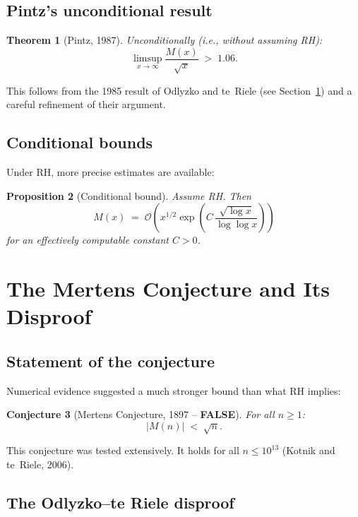 \documentclass[12pt,a4paper]{amsart}
\newtheorem{theorem}{Theorem}[section]
\newtheorem{proposition}[theorem]{Proposition}
\newtheorem{conjecture}[theorem]{Conjecture}
\theoremstyle{definition}
\newcommand{\BigO}{\mathcal{O}}
\begin{document}
\subsection{Pintz's unconditional result}

\begin{theorem}[Pintz, 1987]
\label{thm:pintz}
Unconditionally (i.e., without assuming RH):
\[
  \limsup_{x \to \infty} \frac{M(x)}{\sqrt{x}} \;>\; 1.06.
\]
\end{theorem}

This follows from the 1985 result of Odlyzko and te~Riele (see
Section~\ref{sec:mertens-conjecture}) and a careful refinement of their
argument.

\subsection{Conditional bounds}

Under RH, more precise estimates are available:

\begin{proposition}[Conditional bound]
\label{prop:cond-bound}
Assume RH.  Then
\[
  M(x) \;=\; \BigO\!\left(x^{1/2}\exp\!\left(C\,\frac{\sqrt{\log x}}{\log\log x}\right)\right)
\]
for an effectively computable constant $C > 0$.
\end{proposition}

\section{The Mertens Conjecture and Its Disproof}
\label{sec:mertens-conjecture}

\subsection{Statement of the conjecture}

Numerical evidence suggested a much stronger bound than what RH implies:

\begin{conjecture}[Mertens Conjecture, 1897 -- \textbf{FALSE}]
\label{conj:mertens}
For all $n \ge 1$:
\[
  |M(n)| \;<\; \sqrt{n}.
\]
\end{conjecture}

This conjecture was tested extensively.  It holds for all $n \le 10^{13}$
(Kotnik and te~Riele, 2006).

\subsection{The Odlyzko--te Riele disproof}
\end{document}
